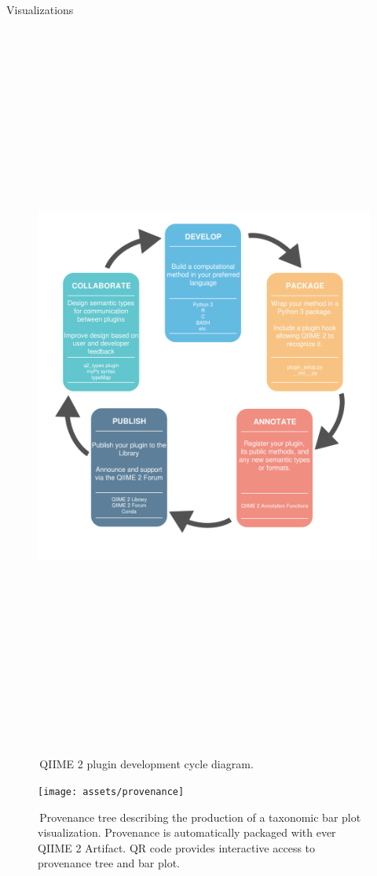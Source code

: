 \documentclass[final]{beamer}
\newlength{\colwidth}
\begin{document}
\begin{frame}[t]
\begin{columns}[t]
\begin{column}{\colwidth}
  \begin{block}{Visualizations}
    \begin{figure}[tph!]
    {\includegraphics[height=24cm]{assets/DevelopmentProcessDiagramGreyWBG}}
    \caption{\,QIIME 2 plugin development cycle diagram. }
    \label{fig:taxabar-plot}
    \end{figure}

    \begin{figure}[tph!]
    {\texttt{[image: assets/provenance]}}
    \caption{\,Provenance tree describing the production of a taxonomic bar plot visualization. Provenance is automatically packaged with ever QIIME 2 Artifact. QR code provides interactive access to provenance tree and bar plot.}
    \label{fig:provenance}
    \end{figure}


\end{block}
\end{column}
\end{columns}
\end{frame}
\end{document}

